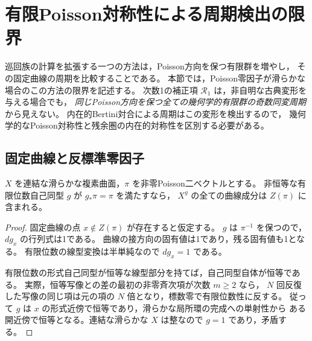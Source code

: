 \section{有限Poisson対称性による周期検出の限界}
\label{sec:kuznetsov-poisson-symmetry-obstruction}

巡回族の計算を拡張する一つの方法は，Poisson方向を保つ有限群を増やし，
その固定曲線の周期を比較することである。
本節では，Poisson零因子が滑らかな場合のこの方法の限界を記述する。
次数1の補正項 $\mathcal R_1$ は，非自明な古典変形を与える場合でも，
\emph{同じPoisson方向を保つ全ての幾何学的有限群の奇数同変周期}から見えない。
内在的Bertini対合による周期はこの変形を検出するので，
幾何学的なPoisson対称性と残余圏の内在的対称性を区別する必要がある。

\subsection{固定曲線と反標準零因子}

\begin{lemma}[有限Poisson自己同型の固定曲線]
\label{lem:ku-poisson-fixed-curves}
$X$ を連結な滑らかな複素曲面，$\pi$ を非零Poisson二ベクトルとする。
非恒等な有限位数自己同型 $g$ が $g_*\pi=\pi$ を満たすなら，
$X^g$ の全ての曲線成分は $Z(\pi)$ に含まれる。
\end{lemma}
\begin{proof}
固定曲線の点 $x\notin Z(\pi)$ が存在すると仮定する。
$g$ は $\pi^{-1}$ を保つので，$d g_x$ の行列式は1である。
曲線の接方向の固有値は1であり，残る固有値も1となる。
有限位数の線型変換は半単純なので $d g_x=1$ である。

有限位数の形式自己同型が恒等な線型部分を持てば，自己同型自体が恒等である。
実際，恒等写像との差の最初の非零斉次項が次数 $m\ge2$ なら，
$N$ 回反復した写像の同じ項は元の項の $N$ 倍となり，標数零で有限位数性に反する。
従って $g$ は $x$ の形式近傍で恒等であり，滑らかな局所環の完成への単射性から
ある開近傍で恒等となる。連結な滑らかな $X$ は整なので $g=1$ であり，矛盾する。
\end{proof}

